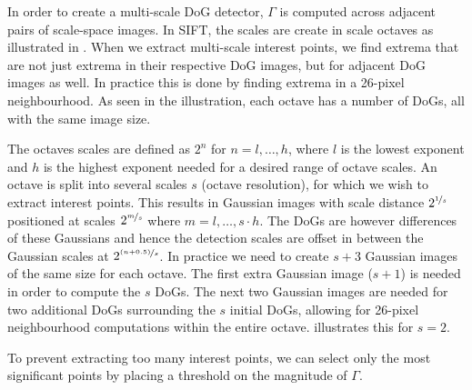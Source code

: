 \documentclass[thesis.tex]{subfiles}
\begin{document}
In order to create a multi-scale DoG detector, $\Gamma$ is computed across adjacent pairs of scale-space images. In SIFT, the scales are create in scale octaves as illustrated in . When we extract multi-scale interest points, we find extrema that are not just extrema in their respective DoG images, but for adjacent DoG images as well. In practice this is done by finding extrema in a 26-pixel neighbourhood. As seen in the illustration, each octave has a number of DoGs, all with the same image size.

The octaves scales are defined as $2^n$ for $n = l,\hdots,h$, where $l$ is the lowest exponent and $h$ is the highest exponent needed for a desired range of octave scales. An octave is split into several scales $s$ (octave resolution), for which we wish to extract interest points. This results in Gaussian images with scale distance $2^{\nicefrac{1}{s}}$ positioned at scales $2^{\nicefrac{m}{s}}$ where $m = l,\hdots,s \cdot h$. The DoGs are however differences of these Gaussians and hence the detection scales are offset in between the Gaussian scales at $2^{\nicefrac{(n+0.5)}{s}}$.
In practice we need to create $s+3$ Gaussian images of the same size for each octave. The first extra Gaussian image ($s+1$) is needed in order to compute the $s$ DoGs. The next two Gaussian images are needed for two additional DoGs surrounding the $s$ initial DoGs, allowing for 26-pixel neighbourhood computations within the entire octave.  illustrates this for $s = 2$.

To prevent extracting too many interest points, we can select only the most significant points by placing a threshold on the magnitude of $\Gamma$.
\end{document}
